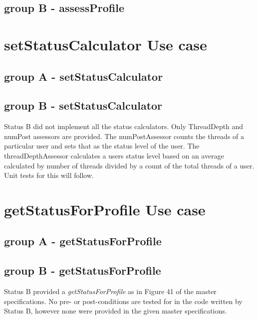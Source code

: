 \documentclass[a4paper,12pt]{article}
\begin{document}
\subsection{group B - assessProfile}



\newpage
\section{setStatusCalculator Use case}
\subsection{group A - setStatusCalculator}


\subsection{group B - setStatusCalculator}
Status B did not implement all the status calculators. Only ThreadDepth and numPost assessors are provided. The numPostAssessor counts the threads of a particular user and sets that as the status level of the user. The threadDepthAssessor calculates a users status level based on an average calculated by number of threads divided by a count of the total threads of a user. Unit tests for this will follow.




\newpage
\section{getStatusForProfile Use case}
\subsection{group A - getStatusForProfile}


\subsection{group B - getStatusForProfile}
Status B provided a \textit{getStatusForProfile} as in Figure 41 of the master specifications. No pre- or post-conditions are tested for in the code written by Status B, however none were provided in the given master specifications.
\end{document}
